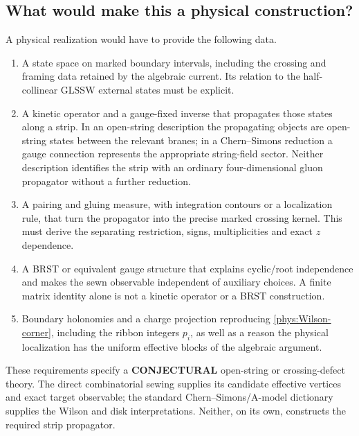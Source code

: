 \documentclass[11pt,letterpaper]{article}
\numberwithin{equation}{section}
\theoremstyle{definition}
\theoremstyle{remark}
\begin{document}
\subsection{What would make this a physical construction?}

A physical realization would have to provide the following data.
\begin{enumerate}
\item A state space on marked boundary intervals, including the
crossing and framing data retained by the algebraic current. Its
relation to the half-collinear GLSSW external states must be explicit.
\item A kinetic operator and a gauge-fixed inverse that propagates
those states along a strip. In an open-string description the
propagating objects are open-string states between the relevant branes;
in a Chern--Simons reduction a gauge connection represents the
appropriate string-field sector. Neither description identifies the
strip with an ordinary four-dimensional gluon propagator without a
further reduction.
\item A pairing and gluing measure, with integration contours or a
localization rule, that turn the propagator into the precise marked
crossing kernel. This must derive the separating restriction, signs,
multiplicities and exact $z$ dependence.
\item A BRST or equivalent gauge structure that explains cyclic/root
independence and makes the sewn observable independent of auxiliary
choices. A finite matrix identity alone is not a kinetic operator or
a BRST construction.
\item Boundary holonomies and a charge projection reproducing
\eqref{phys:Wilson-corner}, including the ribbon integers $p_i$, as well
as a reason the physical localization has the uniform effective blocks
of the algebraic argument.
\end{enumerate}
These requirements specify a \textbf{CONJECTURAL} open-string or
crossing-defect theory. The direct combinatorial sewing supplies its
candidate effective vertices and exact target observable; the standard
Chern--Simons/A-model dictionary supplies the Wilson and disk
interpretations. Neither, on its own, constructs the required strip
propagator.
\end{document}

